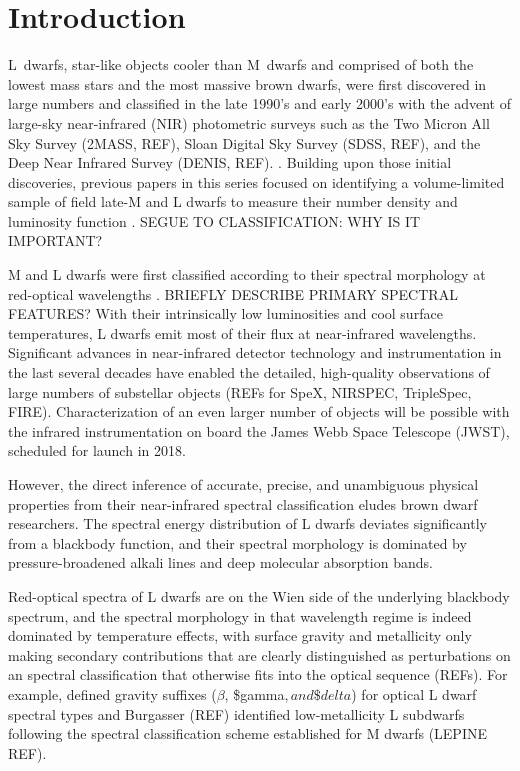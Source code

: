\documentclass[12pt,preprint]{aastex}
\begin{document}

\section{Introduction}

L~dwarfs, star-like objects cooler than M~dwarfs and comprised of both the lowest mass stars and the most massive brown dwarfs, were first discovered in large numbers and classified in the late 1990's and early 2000's with the advent of large-sky near-infrared (NIR) photometric surveys such as the Two Micron All Sky Survey (2MASS, REF), Sloan Digital Sky Survey (SDSS, REF), and the Deep Near Infrared Survey (DENIS, REF). \citep{K99,Martin99,K00,Hawley02,Kendall04,Knapp04}. 
Building upon those initial discoveries, previous papers in this series focused on identifying a volume-limited sample of field late-M and L dwarfs to measure their number density and luminosity function \citep[Papers V, IX, and X]{Cruz03,Cruz07,Reid08}. SEGUE TO CLASSIFICATION: WHY IS IT IMPORTANT?

M and L dwarfs were first classified according to their spectral morphology at red-optical wavelengths \citep{K99,Kirkpatrick05}. BRIEFLY DESCRIBE PRIMARY SPECTRAL FEATURES? With their intrinsically low luminosities and cool surface temperatures, L dwarfs emit most of their flux at near-infrared wavelengths. Significant advances in near-infrared detector technology and instrumentation in the last several decades have enabled the detailed, high-quality observations of large numbers of substellar objects (REFs for SpeX, NIRSPEC, TripleSpec, FIRE). Characterization of an even larger number of objects will be possible with the infrared instrumentation on board the James Webb Space Telescope (JWST), scheduled for launch in 2018.

However, the direct inference of accurate, precise, and unambiguous physical properties from their near-infrared spectral classification eludes brown dwarf researchers. The spectral energy distribution of L dwarfs deviates significantly from a blackbody function, and their spectral morphology is dominated by pressure-broadened alkali lines and deep molecular absorption bands.  

Red-optical spectra of L dwarfs are on the Wien side of the underlying blackbody spectrum, and the spectral morphology in that wavelength regime is indeed dominated by temperature effects, with surface gravity and metallicity only making secondary contributions that are clearly distinguished as perturbations on an spectral classification that otherwise fits into the optical sequence (REFs). For example, \citet{Cruz09} defined gravity suffixes ($\beta$, \$gamma$, and \$delta$) for optical L dwarf spectral types and Burgasser (REF) identified low-metallicity L subdwarfs following the spectral classification scheme established for M dwarfs (LEPINE REF).  
\end{document}
